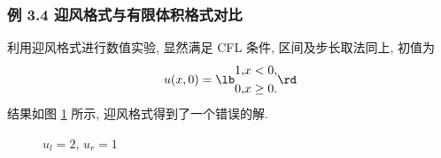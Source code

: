 \documentclass[UTF8, a4paper, 12pt, oneside, onecolumn]{article}
\begin{document}
\subsubsection{例 3.4 迎风格式与有限体积格式对比}

利用迎风格式进行数值实验, 显然满足 CFL 条件, 区间及步长取法同上, 初值为
$$u(x, 0) = \lb \begin{aligned}
	1,	&	x < 0,\\
	0,	&	x \geq 0.
\end{aligned} \rd$$
结果如图 \ref{fig:burgers6} 所示, 迎风格式得到了一个错误的解.

\begin{figure}[H]\centering{}
	\resizebox{0.6\linewidth}{!}{}
	\caption{$u_l = 2$, $u_r = 1$}\label{fig:burgers6}
\end{figure}

\end{document}
